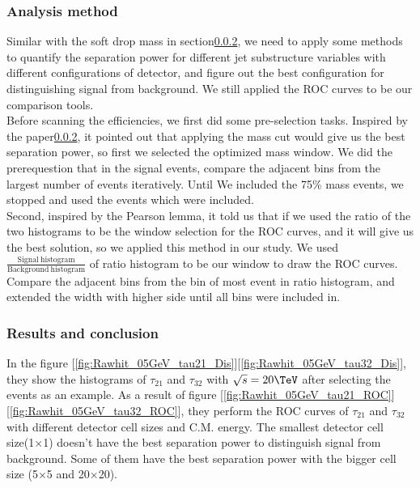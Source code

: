 \documentclass[12pt,twoside,a4paper,an,final]{cms-tdr}
\begin{document}
\subsubsection{Analysis method}\label{Analysis_method_for_Tau_C}
Similar with the soft drop mass in section\ref{}, we need to apply some methods to quantify the separation power for different jet substructure variables with different configurations of detector, and figure out the best configuration for distinguishing signal from background. We still applied the ROC curves to be our comparison tools. \\

Before scanning the efficiencies, we first did some pre-selection tasks. Inspired by the paper\ref{}, it pointed out that applying the mass cut would give us the best separation power, so first we selected the optimized mass window.  We did the prerequestion that in the signal events, compare the adjacent bins from the largest number of events iteratively. Until We included the 75\% mass events, we stopped and used the events which were included.\\

Second, inspired by the Pearson lemma, it told us that if we used the ratio of the two histograms to be the window selection for the ROC curves, and it will give us the best solution, so we applied this method in our study. We used $\frac{\mathrm{Signal \ histogram}}{\mathrm{Background \ histogram}}$ of ratio histogram to be our window to draw the ROC curves. Compare the adjacent bins from the bin of most event in ratio histogram, and extended the width with higher side until all bins were included in.\\

\subsubsection{Results and conclusion}
In the figure [\ref{fig:Rawhit_05GeV_tau21_Dis}][\ref{fig:Rawhit_05GeV_tau32_Dis}], they show the histograms of $\tau_{21}$ and $\tau_{32}$ with $\sqrt{s} = 20\TeV$ after selecting the events as an example. As a result of figure [\ref{fig:Rawhit_05GeV_tau21_ROC}][\ref{fig:Rawhit_05GeV_tau32_ROC}], they perform the ROC curves of $\tau_{21}$ and $\tau_{32}$ with different detector cell sizes and C.M. energy. The smallest detector cell size(1$\times$1) doesn't have the best separation power to distinguish signal from background. Some of them have the best separation power with the bigger cell size (5$\times$5 and 20$\times$20).\\
\end{document}
